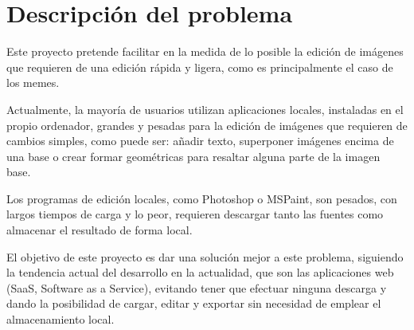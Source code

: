 \chapter{Descripción del problema}

Este proyecto pretende facilitar en la medida de lo posible la edición de imágenes que requieren
de una edición rápida y ligera, como es principalmente el caso de los memes.

Actualmente, la mayoría de usuarios utilizan aplicaciones locales, instaladas en el propio
ordenador, grandes y pesadas para la edición de imágenes que requieren de cambios simples, 
como puede ser: añadir texto, superponer imágenes encima de una base o crear formar geométricas
para resaltar alguna parte de la imagen base.

Los programas de edición locales, como Photoshop o MSPaint, son pesados, con largos tiempos de
carga y lo peor, requieren descargar tanto las fuentes como almacenar el resultado de forma local.

El objetivo de este proyecto es dar una solución mejor a este problema, siguiendo la tendencia
actual del desarrollo en la actualidad, que son las aplicaciones web (SaaS, Software as a Service), 
evitando tener que efectuar ninguna descarga y dando la posibilidad de cargar, editar y exportar sin 
necesidad de emplear el almacenamiento local.


